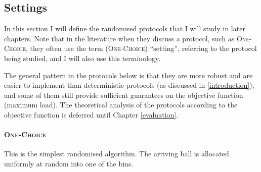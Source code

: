 







\subsection{Settings} \label{settings}

In this section I will define the randomised protocols that I will study in later chapters. Note that in the literature when they discuss a protocol, such as \textsc{One-Choice}, they often use the term (\textsc{One-Choice}) ``setting'', referring to the protocol being studied, and I will also use this terminology.

The general pattern in the protocols below is that they are more robust and are easier to implement than deterministic protocols (as discussed in \cref{introduction}), and some of them still provide sufficient guarantees on the objective function (maximum load). The theoretical analysis of the protocols according to the objective function is deferred until Chapter \ref{evaluation}.


\paragraph{\textsc{One-Choice}}

This is the simplest randomised algorithm. The arriving ball is allocated uniformly at random into one of the bins.

